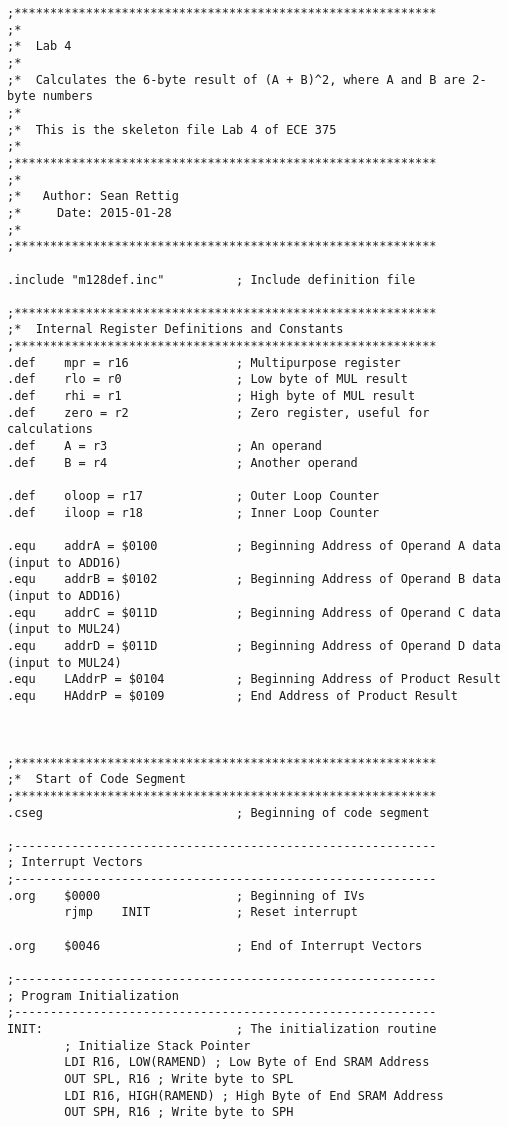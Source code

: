 \documentclass[12pt,letterpaper]{article}
\begin{document}
\begin{verbatim}
;***********************************************************
;*
;*  Lab 4
;*
;*  Calculates the 6-byte result of (A + B)^2, where A and B are 2-byte numbers
;*
;*  This is the skeleton file Lab 4 of ECE 375
;*
;***********************************************************
;*
;*   Author: Sean Rettig
;*     Date: 2015-01-28
;*
;***********************************************************

.include "m128def.inc"          ; Include definition file

;***********************************************************
;*  Internal Register Definitions and Constants
;***********************************************************
.def    mpr = r16               ; Multipurpose register 
.def    rlo = r0                ; Low byte of MUL result
.def    rhi = r1                ; High byte of MUL result
.def    zero = r2               ; Zero register, useful for calculations
.def    A = r3                  ; An operand
.def    B = r4                  ; Another operand

.def    oloop = r17             ; Outer Loop Counter
.def    iloop = r18             ; Inner Loop Counter

.equ    addrA = $0100           ; Beginning Address of Operand A data (input to ADD16)
.equ    addrB = $0102           ; Beginning Address of Operand B data (input to ADD16)
.equ    addrC = $011D           ; Beginning Address of Operand C data (input to MUL24)
.equ    addrD = $011D           ; Beginning Address of Operand D data (input to MUL24)
.equ    LAddrP = $0104          ; Beginning Address of Product Result
.equ    HAddrP = $0109          ; End Address of Product Result



;***********************************************************
;*  Start of Code Segment
;***********************************************************
.cseg                           ; Beginning of code segment

;-----------------------------------------------------------
; Interrupt Vectors
;-----------------------------------------------------------
.org    $0000                   ; Beginning of IVs
        rjmp    INIT            ; Reset interrupt

.org    $0046                   ; End of Interrupt Vectors

;-----------------------------------------------------------
; Program Initialization
;-----------------------------------------------------------
INIT:                           ; The initialization routine
        ; Initialize Stack Pointer
        LDI R16, LOW(RAMEND) ; Low Byte of End SRAM Address
        OUT SPL, R16 ; Write byte to SPL
        LDI R16, HIGH(RAMEND) ; High Byte of End SRAM Address
        OUT SPH, R16 ; Write byte to SPH


\end{verbatim}
\end{document}
